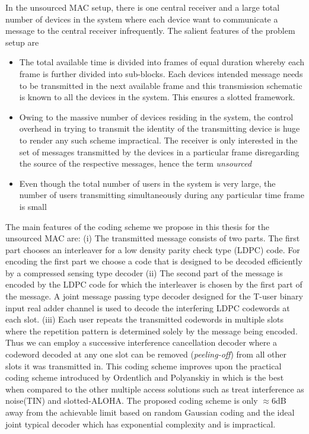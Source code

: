 

\iflonger
In the unsourced MAC setup, there is one central receiver and a large total number of devices in the system where each device want to communicate a message to the central receiver infrequently. The salient features of the problem setup are 

\begin{itemize}
\item The total available time is divided into frames of equal duration whereby each frame is further divided into sub-blocks. Each devices intended message needs to be transmitted in the next available frame and this transmission schematic is known to all the devices in the system. This ensures a slotted framework.
\item Owing to the massive number of devices residing in the system, the control overhead in trying to transmit the identity of the transmitting device is huge to render any such scheme impractical. The receiver is only interested in the set of messages transmitted by the devices in a particular frame disregarding the source of the respective messages, hence the term \textit{unsourced}
\item Even though the total number of users in the system is very large, the number of users transmitting simultaneously during any particular time frame is small
\end{itemize} 
The main features of the coding scheme we propose in this thesis for the unsourced MAC are: (i) The transmitted message consists of two parts. The first part chooses an interleaver for a low density parity check type (LDPC) code. For encoding the first part we choose a code that is designed to be decoded efficiently by a compressed sensing type decoder (ii) The second part of the message is encoded by the LDPC code for which the interleaver is chosen by the first part of the message. A joint message passing type decoder designed for the T-user binary input real adder channel is used to decode the interfering LDPC codewords at each slot. (iii) Each user repeats the transmitted  codewords in multiple slots where the repetition pattern is determined solely by the message being encoded. Thus we can employ a successive interference cancellation decoder where a codeword decoded at any one slot can be removed  (\textit{peeling-off}) from all other slots it was transmitted in. This coding scheme improves upon the practical coding scheme introduced by Ordentlich and Polyanskiy in \cite{ordentlichlow} which is the best when compared to the other multiple access solutions such as treat interference as noise(TIN) and slotted-ALOHA. The proposed coding scheme is only $\approx 6$dB away from the achievable limit based on random Gaussian coding and the ideal joint typical decoder which has exponential complexity and is impractical.
